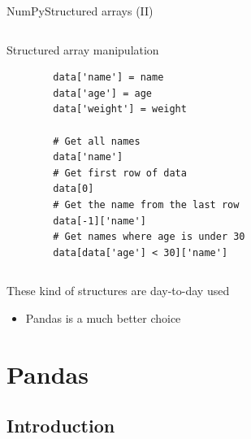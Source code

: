\documentclass[10pt,compress]{beamer} %
\begin{document}
\begin{frame}[fragile]{NumPy}{Structured arrays (II)}
	\begin{columns}
	\begin{exampleblock}{\footnotesize{Structured array manipulation}}
		\vspace{-0.2cm} 
		\begin{lstlisting}
		data['name'] = name
		data['age'] = age
		data['weight'] = weight

		# Get all names
		data['name']
		# Get first row of data
		data[0]
		# Get the name from the last row
		data[-1]['name']
		# Get names where age is under 30
		data[data['age'] < 30]['name']
		\end{lstlisting}
		\vspace{-0.2cm} 
	\end{exampleblock}

	\bigskip

	\end{columns}
	These kind of structures are day-to-day used
	\begin{itemize}
		\item Pandas is a much better choice
	\end{itemize}
\end{frame}


\section{Pandas}
\subsection{Introduction}
\end{document}
